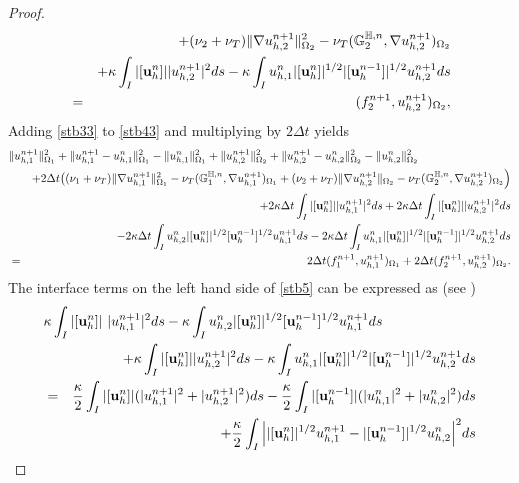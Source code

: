 \documentclass[10pt]{article}%
\numberwithin{equation}{section}
\newcommand{\bff}{{  f}}
\newcommand{\bu}{{\bf u}}
\begin{document}
\begin{proof}
\begin{eqnarray}
	&&+(\nu_2+\nu_T)\|\nabla  {u}_{h,2}^{n+1}\|^2_{\Omega_2} - \nu_T(\mathbb{G}_2^{\mathbb{H},n},\nabla u_{h,2}^{n+1})_{\Omega_2}\nonumber\\
	&&+\kappa \int_{I}|[\bu_h^n]||u_{h,2}^{n+1}|^2ds-\kappa \int_{I}u_{h,1}^n|[\bu_h^n]|^{1/2}|[\bu_h^{n-1}]|^{1/2}u_{h,2}^{n+1}ds\nonumber\\
	&=&(\bff_2^{n+1},u_{h,2}^{n+1})_{\Omega_2},\label{stb43}
	\end{eqnarray}
	Adding \eqref{stb33} to \eqref{stb43} and multiplying by $2\Delta t$ yields
	\begin{eqnarray}
	\lefteqn{\|{u^{n+1}_{h,1}}\|_{\Omega_1}^2+\|{{u^{n+1}_{h,1}}-u_{h,1}^{n}}\|_{\Omega_1}^2-\|{u^{n}_{h,1}}\|_{\Omega_1}^2 +\|{u^{n+1}_{h,2}}\|_{\Omega_2}^2+\|{{u^{n+1}_{h,2}}-u_{h,2}^{n}}\|_{\Omega_2}^2-\|{u^{n}_{h,2}}\|_{\Omega_2}^2} \nonumber\\
	&&+2\Delta t\big((\nu_1+\nu_T)\|\nabla  u_{h,1}^{n+1}\|^2_{\Omega_1}-\nu_T (\mathbb{G}_1^{\mathbb{H},n},\nabla u_{h,1}^{n+1})_{\Omega_1}+(\nu_2+\nu_T) \|\nabla  {u}_{h,2}^{n+1}\|_{\Omega_2}-\nu_T (\mathbb{G}_2^{\mathbb{H},n},\nabla u_{h,2}^{n+1})_{\Omega_2}\Big) \nonumber\\
	&&+2\kappa\Delta t \int_{I}|[\bu_h^n]||u_{h,1}^{n+1}|^2ds+2\kappa\Delta t \int_{I}|[\bu_h^n]||u_{h,2}^{n+1}|^2ds \nonumber\\&&-2\kappa\Delta t \int_{I}u_{h,2}^n|[\bu_h^n]|^{1/2}[\bu_h^{n-1}]^{1/2}u_{h,1}^{n+1}ds-2\kappa\Delta t \int_{I}u_{h,1}^n|[\bu_h^n]|^{1/2}|[\bu_h^{n-1}]|^{1/2}u_{h,2}^{n+1}ds\nonumber\\
	&=&2\Delta t(\bff_1^{n+1},u_{h,1}^{n+1})_{\Omega_1}+2\Delta t(\bff_2^{n+1},u_{h,2}^{n+1})_{\Omega_2}.\label{stb5}
	\end{eqnarray}
	The interface terms on the left hand side of \eqref{stb5} can be expressed as (see \cite{CHL12})
	\begin{eqnarray}
	\lefteqn{\kappa \int_{I}|[\bu_h^n]| \, \,|u_{h,1}^{n+1}|^2ds-\kappa \int_{I}u_{h,2}^n|[\bu_h^n]|^{1/2}[\bu_h^{n-1}]^{1/2}u_{h,1}^{n+1}ds}\nonumber\\
	&&+\kappa \int_{I}|[\bu_h^n]||u_{h,2}^{n+1}|^2ds-\kappa \int_{I}u_{h,1}^n|[\bu_h^n]|^{1/2}|[\bu_h^{n-1}]|^{1/2}u_{h,2}^{n+1}ds\nonumber\\
	&=&\dfrac{\kappa}{2} \int_{I}|[\bu_h^n]| (|u_{h,1}^{n+1}|^2+|u_{h,2}^{n+1}|^2)ds- \dfrac{\kappa}{2}\int_{I}|[\bu_h^{n-1}]| (|u_{h,1}^{n}|^2+|u_{h,2}^{n}|^2)ds\nonumber\\
	&&+\dfrac{\kappa}{2} \int_{I}\Big{|}|[\bu_h^n]|^{1/2}u_{h,1}^{n+1}-|[\bu_h^{n-1}]|^{1/2}u_{h,2}^{n}\Big{|}^2ds\nonumber\\

\end{eqnarray}
\end{proof}
\end{document}
